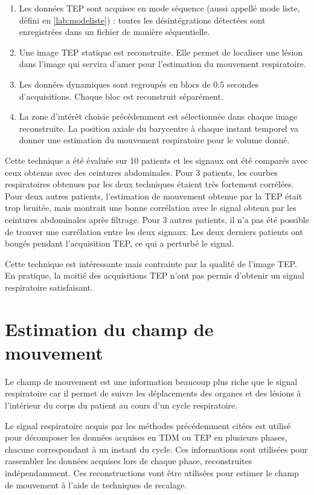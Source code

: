 \begin{enumerate}
 \item Les données TEP sont acquises en mode séquence (aussi appellé mode liste, défini en \ref{lab:modeliste}) : toutes les désintégrations détectées sont enregistrées dans un fichier de manière séquentielle.
 \item Une image TEP statique est reconstruite. Elle permet de localiser une lésion dans l'image qui servira d'amer pour l'estimation du mouvement respiratoire.
 \item Les données dynamiques sont regroupés en blocs de 0.5 secondes d'acquisitions. Chaque bloc est reconstruit séparément. 
 \item La zone d'intérêt choisie précédemment est sélectionnée dans chaque image reconstruite. La position axiale du barycentre à chaque instant temporel va donner une estimation du mouvement respiratoire pour le volume donné.
\end{enumerate}

Cette technique a été évaluée sur 10 patients et les signaux ont été comparés avec ceux obtenus avec des ceintures abdominales. Pour 3 patients, les courbes respiratoires obtenues par les deux techniques étaient très fortement corrélées. Pour deux autres patients, l'estimation de mouvement obtenue par la TEP était trop bruitée, mais montrait une bonne corrélation avec le signal obtenu par les ceintures abdominales après filtrage. Pour 3 autres patients, il n'a pas été possible de trouver une corrélation entre les deux signaux. Les deux derniers patients ont bougés pendant l'acquisition TEP, ce qui a perturbé le signal.

Cette technique est intéressante mais contrainte par la qualité de l'image TEP. En pratique, la moitié des acquisitions TEP n'ont pas permis d'obtenir un signal respiratoire satisfaisant.


\section{Estimation du champ de mouvement}
\label{lab:estimChamp}

Le champ de mouvement est une information beaucoup plus riche que le signal respiratoire car il permet de suivre les déplacements des organes et des lésions à l'intérieur du corps du patient au cours d'un cycle respiratoire.

Le signal respiratoire acquis par les méthodes précédemment citées est utilisé pour décomposer les données acquises en TDM ou TEP en plusieurs phases, chacune correspondant à un instant du cycle. Ces informations sont utilisées pour rassembler les données acquises lors de chaque phase, reconstruites indépendamment. Ces reconstructions vont être utilisées pour estimer le champ de mouvement à l'aide de techniques de recalage.


